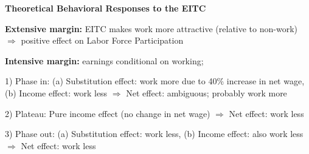 \documentclass[landscape]{slides}
\begin{document}
%
%
%
%
%
%
%
%
%
%
%
%
%
%



\begin{slide}
\begin{center}
{\bf Theoretical Behavioral Responses to the EITC}
\end{center}
{\bf Extensive margin:} EITC makes work more attractive (relative to non-work)
$\Rightarrow$ positive effect on Labor Force
Participation


{\bf Intensive margin:} earnings conditional on working;

1) Phase in: (a) Substitution effect: work more due to 40\% increase
in net wage, (b) Income effect: work less $\Rightarrow$ Net
effect: ambiguous; probably work more

2) Plateau: Pure income effect (no change in net wage)
$\Rightarrow$ Net effect: work less

3) Phase out: (a) Substitution effect: work less, (b) Income
effect: also work less $\Rightarrow$ Net effect: work less

\end{slide}
\end{document}
